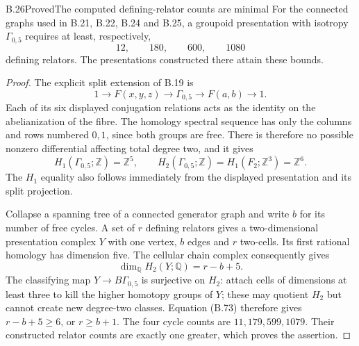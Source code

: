 \begin{result}{B.26}{Proved}{The computed defining-relator counts are minimal}
For the connected graphs used in B.21, B.22, B.24 and
B.25, a groupoid presentation with isotropy
$\Gamma_{0,5}$ requires at least, respectively,
\[
 12,\qquad180,\qquad600,\qquad1080
\]
defining relators.  The presentations constructed there
attain these bounds.
\end{result}
\begin{proof}
The explicit split extension of B.19 is
\[
 1\longrightarrow F(x,y,z)\longrightarrow\Gamma_{0,5}
 \longrightarrow F(a,b)\longrightarrow1.
\]
Each of its six displayed conjugation relations acts
as the identity on the abelianization of the fibre.
The homology spectral sequence has only the columns
and rows numbered $0,1$, since both groups are free.
There is therefore no possible nonzero differential
affecting total degree two, and it gives
\[
 H_1(\Gamma_{0,5};\mathbb Z)=\mathbb Z^5,\qquad
 H_2(\Gamma_{0,5};\mathbb Z)
   =H_1(F_2;\mathbb Z^3)=\mathbb Z^6.              \tag{B.73}
\]
The $H_1$ equality also follows immediately from the
displayed presentation and its split projection.

Collapse a spanning tree of a connected generator graph
and write $b$ for its number of free cycles.  A set of
$r$ defining relators gives a two-dimensional presentation
complex $Y$ with one vertex, $b$ edges and $r$ two-cells.
Its first rational homology has dimension five.  The
cellular chain complex consequently gives
\[
 \dim_{\mathbb Q}H_2(Y;\mathbb Q)=r-b+5.
\]
The classifying map $Y\to B\Gamma_{0,5}$ is surjective
on $H_2$: attach cells of dimensions at least three
to kill the higher homotopy groups of $Y$; these may
quotient $H_2$ but cannot create new degree-two classes.
Equation (B.73) therefore gives $r-b+5\geq6$, or
$r\geq b+1$.  The four cycle counts are $11,179,599,1079$.
Their constructed relator counts are exactly one greater,
which proves the assertion.
\end{proof}
